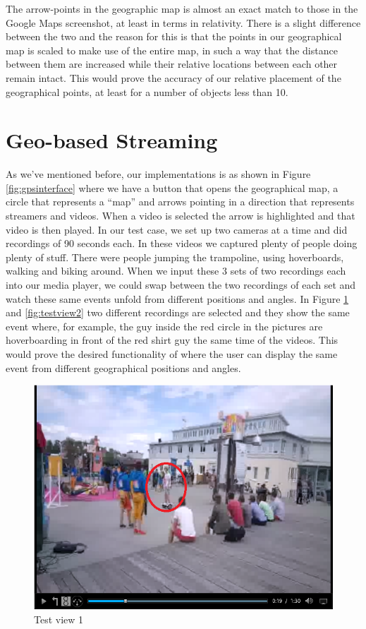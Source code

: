 The arrow-points in the geographic map is almost an exact match to those in the Google Maps screenshot, at least in terms in relativity. There is a slight difference between the two and the reason for this is that the points in our geographical map is scaled to make use of the entire map, in such a way that the distance between them are increased while their relative locations between each other remain intact. This would prove the accuracy of our relative placement of the geographical points, at least for a number of objects less than 10.

\section{Geo-based Streaming}
\label{sec:geobasedstreaming}

As we’ve mentioned before, our implementations is as shown in Figure \ref{fig:gpsinterface} where we have a button that opens the geographical map, a circle that represents a “map” and arrows pointing in a direction that represents streamers and videos. When a video is selected the arrow is highlighted and that video is then played. In our test case, we set up two cameras at a time and did recordings of 90 seconds each. In these videos we captured plenty of people doing plenty of stuff. There were people jumping the trampoline, using hoverboards, walking and biking around. When we input these 3 sets of two recordings each into our media player, we could swap between the two recordings of each set and watch these same events unfold from different positions and angles. In Figure \ref{fig:testview1} and \ref{fig:testview2} two different recordings are selected and they show the same event where, for example, the guy inside the red circle in the pictures are hoverboarding in front of the red shirt guy the same time of the videos. This would prove the desired functionality of where the user can display the same event from different geographical positions and angles.

\begin{figure}[ht!]
\begin{center}
	\includegraphics[scale=0.8]{Hoverboard_1.png}
	\caption{Test view 1}
	\label{fig:testview1}
\end{center}
\end{figure}

